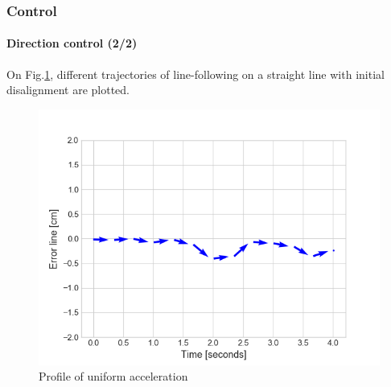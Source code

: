 \documentclass[10pt]{beamer}
\begin{document}

\begin{frame}
\frametitle{Control}
\framesubtitle{Direction control (2/2)}
On Fig.\ref{fig:perturbation}, different trajectories of line-following on a straight line with initial disalignment are plotted.
\begin{figure}[hbtp]
\centering
\label{fig:perturbation}
\includegraphics[scale=0.45]{figures/perturbation}
\caption{Profile of uniform acceleration}
\end{figure}
\end{frame}

\end{document}
